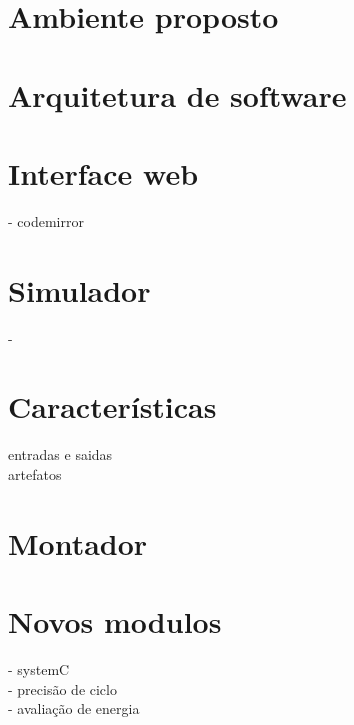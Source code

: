 \section{Ambiente proposto}%
\section{Arquitetura de software}
\section{Interface web}
		- codemirror\\
		
\section{Simulador}
		- 
\section{Características}
	entradas e saidas\\
	artefatos\\
\section{Montador}
\section{Novos modulos}
		- systemC\\
		- precisão de ciclo\\
		- avaliação de energia\\
